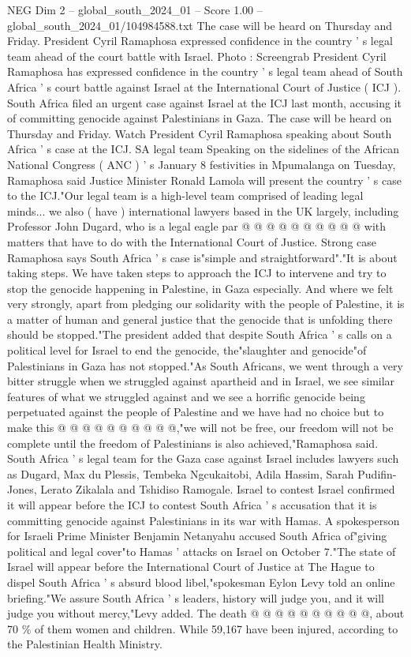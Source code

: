 \begin{textsample}{NEG Dim 2 – global\_south\_2024\_01 – Score 1.00 – global\_south\_2024\_01/104984588.txt}  \label{ex:f2_neg_352}
The case will be heard on Thursday and Friday.
President Cyril Ramaphosa expressed confidence in the country ' s legal team ahead of the court battle with Israel.
Photo : Screengrab President Cyril Ramaphosa has expressed confidence in the country ' s legal team ahead of South Africa ' s court battle against Israel at the International Court of Justice ( ICJ ).
South Africa filed an urgent case against Israel at the ICJ last month, accusing it of committing genocide against Palestinians in Gaza.
The case will be heard on Thursday and Friday.
Watch President Cyril Ramaphosa speaking about South Africa ' s case at the ICJ.
SA legal team Speaking on the sidelines of the African National Congress ( ANC ) ' s January 8 festivities in Mpumalanga on Tuesday, Ramaphosa said Justice Minister Ronald Lamola will present the country ' s case to the ICJ."Our legal team is a high-level team comprised of leading legal minds... we also ( have ) international lawyers based in the UK largely, including Professor John Dugard, who is a legal eagle par @ @ @ @ @ @ @ @ @ @ with matters that have to do with the International Court of Justice.
Strong case Ramaphosa says South Africa ' s case is"simple and straightforward"."It is about taking steps.
We have taken steps to approach the ICJ to intervene and try to stop the genocide happening in Palestine, in Gaza especially.
And where we felt very strongly, apart from pledging our solidarity with the people of Palestine, it is a matter of human and general justice that the genocide that is unfolding there should be stopped."The president added that despite South Africa ' s calls on a political level for Israel to end the genocide, the"slaughter and genocide"of Palestinians in Gaza has not stopped."As South Africans, we went through a very bitter struggle when we struggled against apartheid and in Israel, we see similar features of what we struggled against and we see a horrific genocide being perpetuated against the people of Palestine and we have had no choice but to make this @ @ @ @ @ @ @ @ @ @,"we will not be free, our freedom will not be complete until the freedom of Palestinians is also achieved,"Ramaphosa said.
South Africa ' s legal team for the Gaza case against Israel includes lawyers such as Dugard, Max du Plessis, Tembeka Ngcukaitobi, Adila Hassim, Sarah Pudifin-Jones, Lerato Zikalala and Tshidiso Ramogale.
Israel to contest Israel confirmed it will appear before the ICJ to contest South Africa ' s accusation that it is committing genocide against Palestinians in its war with Hamas.
A spokesperson for Israeli Prime Minister Benjamin Netanyahu accused South Africa of"giving political and legal cover"to Hamas ' attacks on Israel on October 7."The state of Israel will appear before the International Court of Justice at The Hague to dispel South Africa ' s absurd blood libel,"spokesman Eylon Levy told an online briefing."We assure South Africa ' s leaders, history will judge you, and it will judge you without mercy,"Levy added.
The death @ @ @ @ @ @ @ @ @ @, about 70 \% of them women and children.
While 59,167 have been injured, according to the Palestinian Health Ministry.

\end{textsample}
